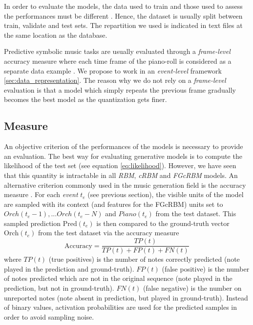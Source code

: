 \documentclass{article}
\begin{document}
In order to evaluate the models, the data used to train and those used to assess the performances must be different \cite{bishop2006pattern}. Hence, the dataset is usually split between train, validate and test sets. The repartition we used is indicated in text files at the same location as the database. 

Predictive symbolic music tasks are usually evaluated through a \textit{frame-level} accuracy measure where each time frame of the piano-roll is considered as a separate data example \cite{DBLP:journals/corr/YaoCVDD15,boulanger2012modeling,lavrenko2003polyphonic}.
We propose to work in an \textit{event-level} framework \ref{sec:data_representation}. The reason why we do not rely on a \textit{frame-level} evaluation is that a model which simply repeats the previous frame gradually becomes the best model as the quantization gets finer.

\subsection{Measure}
An objective criterion of the performances of the models is necessary to provide an evaluation. 
The best way for evaluating generative models is to compute the likelihood of the test set (see equation \ref{eq:likelihood}). However, we have seen that this quantity is intractable in all \textit{RBM}, \textit{cRBM} and \textit{FGcRBM} models. 
An alternative criterion commonly used in the music generation field is the accuracy measure \cite{DBLP:journals/corr/YaoCVDD15,boulanger2012modeling,lavrenko2003polyphonic}. For each \textit{event} $t_{e}$ (see previous section), the visible units of the model are sampled with its context (and features for the FGcRBM) units set to $Orch(t_{e}-1),... Orch(t_{e}-N)$ and $Piano(t_{e})$ from the test dataset. This sampled prediction $\text{Pred}(t_{e})$ is then compared to the ground-truth vector $\text{Orch}(t_{e})$ from the test dataset via the accuracy measure
\begin{equation}
\text{Accuracy}  = \frac{TP(t)}{TP(t) + FP(t) + FN(t)}
\label{eq:accuracy}
\end{equation}
where $TP(t)$ (true positives) is the number of notes correctly predicted (note played in the prediction and ground-truth). $FP(t)$ (false positive) is the number of notes predicted which are not in the original sequence (note played in the prediction, but not in ground-truth). $FN(t)$ (false negative) is the number on unreported notes (note absent in prediction, but played in ground-truth). 
Instead of binary values, activation probabilities are used for the predicted samples in order to avoid sampling noise.
\end{document}
